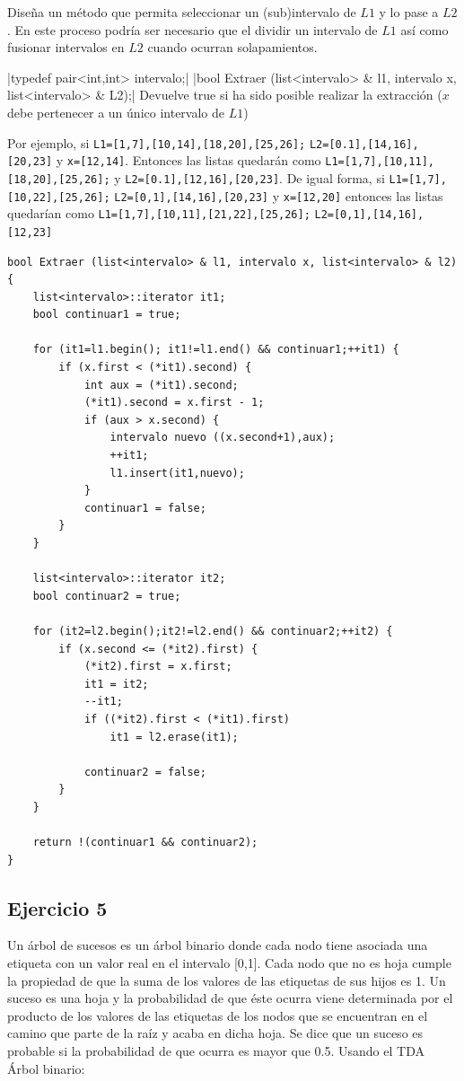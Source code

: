 \documentclass[10pt,a4paper,spanish]{report}
\begin{document}
\noindent
Diseña un método que permita seleccionar un (sub)intervalo de $L1$ y lo pase a $L2$. En este proceso podría ser necesario que el dividir un intervalo de $L1$ así como fusionar intervalos en $L2$ cuando ocurran solapamientos.

|typedef pair<int,int> intervalo;|
|bool Extraer (list<intervalo> & l1, intervalo x, list<intervalo> & L2);|
Devuelve true si ha sido posible realizar la extracción ($x$ debe pertenecer a un único intervalo de $L1$)

\noindent
Por ejemplo, si \verb*|L1=[1,7],[10,14],[18,20],[25,26];| \verb*|L2=[0.1],[14,16],[20,23]| y \verb*|x=[12,14]|. Entonces las listas quedarán como \verb*|L1=[1,7],[10,11],[18,20],[25,26];| y \verb*|L2=[0.1],[12,16],[20,23]|. De igual forma, si \verb*|L1=[1,7],[10,22],[25,26];| \verb*|L2=[0,1],[14,16],[20,23]| y \verb*|x=[12,20]| entonces las listas quedarían como \verb*|L1=[1,7],[10,11],[21,22],[25,26];| \verb*|L2=[0,1],[14,16],[12,23]|


\begin{verbatim}
bool Extraer (list<intervalo> & l1, intervalo x, list<intervalo> & l2) {
    list<intervalo>::iterator it1;
    bool continuar1 = true;

    for (it1=l1.begin(); it1!=l1.end() && continuar1;++it1) {
        if (x.first < (*it1).second) {
            int aux = (*it1).second;
            (*it1).second = x.first - 1;
            if (aux > x.second) {
                intervalo nuevo ((x.second+1),aux);
                ++it1;
                l1.insert(it1,nuevo);
            }
            continuar1 = false;
        }
    }

    list<intervalo>::iterator it2;
    bool continuar2 = true;

    for (it2=l2.begin();it2!=l2.end() && continuar2;++it2) {
        if (x.second <= (*it2).first) {
            (*it2).first = x.first;
            it1 = it2;
            --it1;
            if ((*it2).first < (*it1).first) 
                it1 = l2.erase(it1);

            continuar2 = false;
        }
    }

    return !(continuar1 && continuar2);
}
\end{verbatim}

\subsection{\textcolor[rgb]{0.5,0.8,1}Ejercicio 5}
\noindent
Un árbol de sucesos es un árbol binario donde cada nodo tiene asociada una etiqueta con un valor real en el intervalo [0,1]. Cada nodo que no es hoja cumple la propiedad de que la suma de los valores de las etiquetas de sus hijos es 1. Un suceso es una hoja y la probabilidad de que éste ocurra viene determinada por el producto de los valores de las etiquetas de los nodos que se encuentran en el camino que parte de la raíz y acaba en dicha hoja. Se dice que un suceso es probable si la probabilidad de que ocurra es mayor que 0.5. Usando el TDA Árbol binario:
\end{document}
